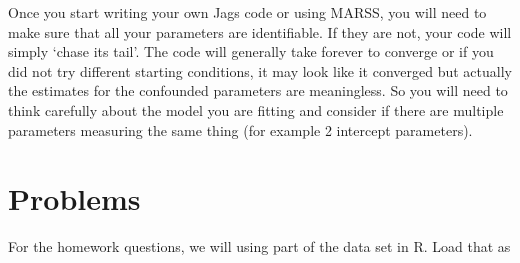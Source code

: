 Once you start writing your own Jags code or using MARSS, you will need to make sure that all your parameters are identifiable.  If they are not, your code will simply `chase its tail'.  The code will generally take forever to converge or if you did not try different starting conditions, it may look like it converged but actually the estimates for the confounded parameters are meaningless.   So you will need to think carefully about the model you are fitting and consider if there are multiple parameters measuring the same thing (for example 2 intercept parameters).

\clearpage
\renewcommand{\rightmark}{}
\section*{Problems}

For the homework questions, we will using part of the \verb@airquality@ data set in R.  Load that as
\begin{Schunk}
\end{Schunk}


